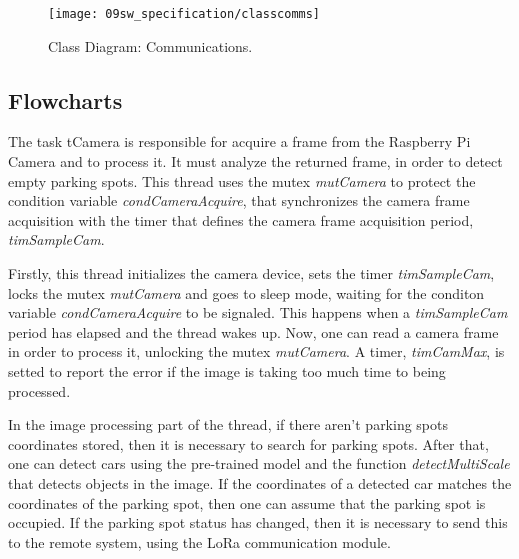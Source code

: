 \begin{figure}[H]
	\centering		\texttt{[image: 09sw\_specification/classcomms]}
	\caption{Class Diagram: Communications.}
	\label{fig:classcomm}
\end{figure}

\subsection{Flowcharts}
{}

The task tCamera is responsible for acquire a frame from the Raspberry Pi Camera and to process it. It must analyze the returned frame, in order to detect empty parking spots. This thread uses the mutex \textit{mutCamera} to protect the condition variable \textit{condCameraAcquire}, that synchronizes the camera frame acquisition with the timer that defines the camera frame acquisition period, \textit{timSampleCam}.

Firstly, this thread initializes the camera device, sets the timer \textit{timSampleCam}, locks the mutex \textit{mutCamera} and goes to sleep mode, waiting for the conditon variable \textit{condCameraAcquire} to be signaled. This happens when a \textit{timSampleCam} period has elapsed and the thread wakes up. Now, one can read a camera frame in order to process it, unlocking the mutex \textit{mutCamera}. A timer, \textit{timCamMax}, is setted to report the error if the image is taking too much time to being processed.

In the image processing part of the thread, if there aren't parking spots coordinates stored, then it is necessary to search for parking spots. After that, one can detect cars using the pre-trained model and the function \textit{detectMultiScale} that detects objects in the image. If the coordinates of a detected car matches the coordinates of the parking spot, then one can assume that the parking spot is occupied. If the parking spot status has changed, then it is necessary to send this to the remote system, using the LoRa communication module.

